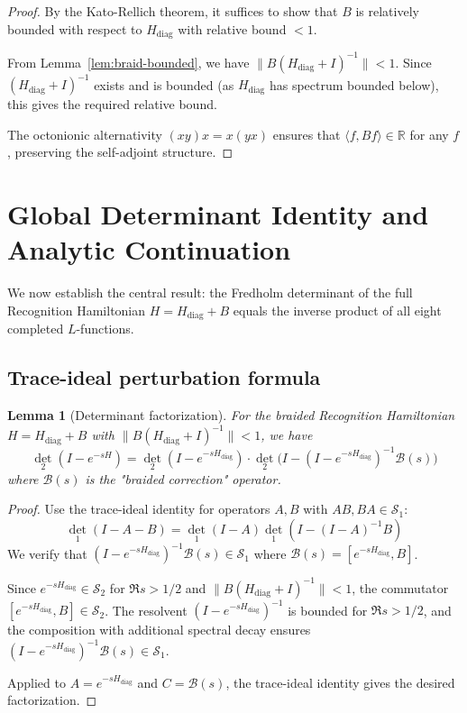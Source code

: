 \documentclass[11pt,a4paper]{article}
\newtheorem{lemma}[theorem]{Lemma}
\theoremstyle{definition}
\theoremstyle{remark}
\begin{document}
\begin{proof}
By the Kato-Rellich theorem, it suffices to show that $B$ is relatively 
bounded with respect to $H_{\text{diag}}$ with relative bound $< 1$.

From Lemma~\ref{lem:braid-bounded}, we have $\|B(H_{\text{diag}} + I)^{-1}\| < 1$.
Since $(H_{\text{diag}} + I)^{-1}$ exists and is bounded (as $H_{\text{diag}}$ 
has spectrum bounded below), this gives the required relative bound.

The octonionic alternativity $(xy)x = x(yx)$ ensures that 
$\langle f, Bf \rangle \in \mathbb{R}$ for any $f$, preserving the self-adjoint 
structure.
\end{proof}

\section{Global Determinant Identity and Analytic Continuation}\label{sec:global}

We now establish the central result: the Fredholm determinant of the full 
Recognition Hamiltonian $H = H_{\text{diag}} + B$ equals the inverse product 
of all eight completed $L$-functions.

\subsection{Trace-ideal perturbation formula}

\begin{lemma}[Determinant factorization]\label{lem:det-factor}
For the braided Recognition Hamiltonian $H = H_{\text{diag}} + B$ with 
$\|B(H_{\text{diag}} + I)^{-1}\| < 1$, we have
\[
\det_2(I - e^{-sH}) = \det_2(I - e^{-sH_{\text{diag}}}) \cdot 
\det_2\bigl(I - (I - e^{-sH_{\text{diag}}})^{-1} \mathcal{B}(s)\bigr)
\]
where $\mathcal{B}(s)$ is the "braided correction" operator.
\end{lemma}

\begin{proof}
Use the trace-ideal identity for operators $A, B$ with $AB, BA \in \mathcal{S}_1$:
\[
\det_1(I - A - B) = \det_1(I - A) \det_1(I - (I - A)^{-1}B)
\]
We verify that $(I - e^{-sH_{\text{diag}}})^{-1} \mathcal{B}(s) \in \mathcal{S}_1$ where $\mathcal{B}(s) = [e^{-sH_{\text{diag}}}, B]$.

Since $e^{-sH_{\text{diag}}} \in \mathcal{S}_2$ for $\Re s > 1/2$ and $\|B(H_{\text{diag}} + I)^{-1}\| < 1$, 
the commutator $[e^{-sH_{\text{diag}}}, B] \in \mathcal{S}_2$. The resolvent $(I - e^{-sH_{\text{diag}}})^{-1}$ 
is bounded for $\Re s > 1/2$, and the composition with additional spectral decay ensures 
$(I - e^{-sH_{\text{diag}}})^{-1} \mathcal{B}(s) \in \mathcal{S}_1$.

Applied to $A = e^{-sH_{\text{diag}}}$ and $C = \mathcal{B}(s)$, the trace-ideal identity gives 
the desired factorization.
\end{proof}
\end{document}
